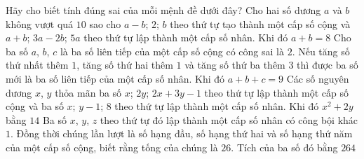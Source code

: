 \begin{ex}%
 Hãy cho biết tính đúng sai của mỗi mệnh đề  dưới đây?
 \choiceTF 
  {Cho hai số dương $ a $ và $ b $ không vượt quá $ 10 $ sao cho $ a-b $; $ 2 $; $ b $ theo thứ tự tạo thành một cấp số cộng và $ a+b $; $ 3a-2b $; $ 5a $  theo thứ tự lập thành một cấp số nhân. Khi đó $ a+b=8 $}
  {\True Cho ba  số $a$, $b$, $c$ là ba số liên tiếp của một cấp số cộng có công sai là $2$. Nếu tăng số thứ nhất thêm $1$, tăng số thứ hai thêm $1$ và tăng số thứ ba thêm $3$ thì được ba số mới là ba số liên tiếp của một cấp số nhân. Khi đó $a+b+c=9$}
  {\True Các số nguyên dương $x$, $y$ thỏa mãn ba số $x$; $2y$; $2x+3y-1$ theo thứ tự lập thành một cấp  số cộng và ba số $x$; $y-1$; $8$ theo thứ tự lập thành một cấp số nhân. Khi đó $x^2+2y$ bằng $14$}
  {Ba số $x$, $y$, $z$ theo thứ tự đó lập thành một cấp số nhân có công bội khác  $1$. Đồng thời chúng lần lượt là số hạng đầu, số hạng thứ hai và số hạng thứ năm của một cấp số cộng, biết rằng tống của chúng là $26$. Tích của ba số đó bằng $264$}
\end{ex}
